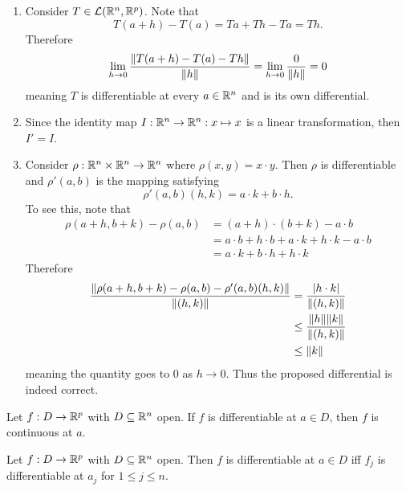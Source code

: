 \documentclass[../main.tex]{subfiles}
\begin{document}
\begin{example}
    \hfill
    \begin{enumerate}
        \item Consider $T \in \mathcal{L}(\mathbb{R}^n, \mathbb{R}^p)$. Note that
            \[
                T(a + h) - T(a) = Ta + Th - Ta = Th
            .\]
            Therefore
            \[
                \lim_{h \to 0} \frac{\norm{T(a+h) - T(a) - Th}}{\norm{h}} = \lim_{h \to 0} \frac{0}{\norm{h}} = 0
            \]
            meaning $T$ is differentiable at every $a \in \mathbb{R}^n$ and is its own differential.
        \item Since the identity map $I : \mathbb{R}^n \to \mathbb{R}^n : x \mapsto x$ is a linear transformation, then $I' = I$.
        \item Consider $\rho : \mathbb{R}^n \times \mathbb{R}^n \to \mathbb{R}^n$ where $\rho(x,y) = x \cdot y$. Then $\rho$ is differentiable and $\rho'(a,b)$ is the mapping satisfying
            \[
                \rho'(a,b) (h,k) = a \cdot k + b \cdot h
            .\]
            To see this, note that
            \begin{align*}
                \rho(a+h, b+k) - \rho(a,b) &= (a+h) \cdot (b+k) - a \cdot b \\
                &= a \cdot b + h \cdot b + a \cdot k + h \cdot k - a \cdot b \\
                &= a \cdot k + b \cdot h + h \cdot k
            \end{align*}
            Therefore
            \begin{align*}
                \frac{\norm{\rho(a+h, b+k) - \rho(a,b) - \rho'(a,b)(h,k)}}{\norm{(h,k)}} &= \frac{|h \cdot k|}{\norm{(h,k)}} \\
                &\leq \frac{\norm{h} \norm{k}}{\norm{(h,k)}} \\
                &\leq \norm{k}
            \end{align*}
            meaning the quantity goes to $0$ as $h \to 0$. Thus the proposed differential is indeed correct.
    \end{enumerate}
\end{example}

\begin{theorem}
    Let $f : D \to \mathbb{R}^p$ with $D \subseteq \mathbb{R}^n$ open. If $f$ is differentiable at $a \in D$, then $f$ is continuous at $a$.
\end{theorem}

\begin{theorem}
    Let $f : D \to \mathbb{R}^p$ with $D \subseteq \mathbb{R}^n$ open. Then $f$ is differentiable at $a \in D$ iff $f_j$ is differentiable at $a_j$ for $1 \leq j \leq n$.
\end{theorem}
\end{document}
